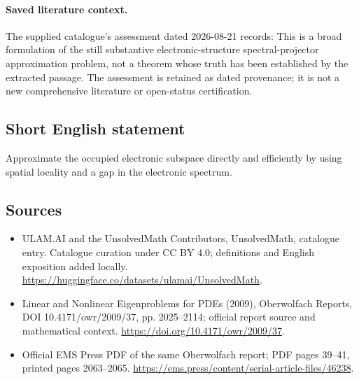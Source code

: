\documentclass[11pt]{article}
\begin{document}
\paragraph{Saved literature context.} The supplied catalogue's assessment dated 2026-08-21 records: This is a broad formulation of the still substantive electronic-structure spectral-projector approximation problem, not a theorem whose truth has been established by the extracted passage. The assessment is retained as dated provenance; it is not a new comprehensive literature or open-status certification.
\subsection{Short English statement}
Approximate the occupied electronic subspace directly and efficiently by using spatial locality and a gap in the electronic spectrum.
\subsection{Sources}
\begin{itemize}
\item[\hypertarget{source:statement:1}{S1}] ULAM.AI and the UnsolvedMath Contributors, UnsolvedMath, catalogue entry. Catalogue curation under CC BY 4.0; definitions and English exposition added locally.
\url{https://huggingface.co/datasets/ulamai/UnsolvedMath}.
\item[\hypertarget{source:statement:2}{S2}] Linear and Nonlinear Eigenproblems for PDEs (2009), Oberwolfach Reports, DOI 10.4171/owr/2009/37, pp. 2025--2114; official report source and mathematical context.
\url{https://doi.org/10.4171/owr/2009/37}.
\item[\hypertarget{source:statement:3}{S3}] Official EMS Press PDF of the same Oberwolfach report; PDF pages 39--41, printed pages 2063--2065.
\url{https://ems.press/content/serial-article-files/46238}.
\end{itemize}
\label{end:statement}
\end{document}

